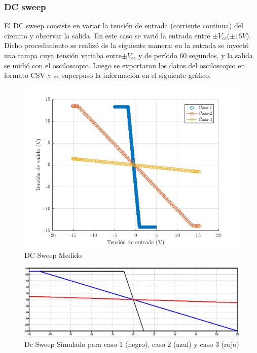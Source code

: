 \documentclass[../../main.tex]{subfiles}
\begin{document}
\subsubsection{DC sweep}
El DC sweep consiste en variar la tensión de entrada (corriente continua) del circuito y observar la salida. En este caso se varió la entrada entre $\pm V_{cc}$($\pm 15 V$). Dicho procedimiento se realizó de la siguiente manera: en la entrada se inyect\'o una rampa  cuya  tensión variaba entre$\pm V_{cc}$ y de per\'iodo 60 segundos, y la salida se midió con el osciloscopio. Luego se exportaron los datos del osciloscopio en formato CSV y se superpuso la informaci\'on en el siguiente gr\'afico.

\begin{figure}[H]
\centering
\includegraphics[width=1\textwidth]{imagenes/dc_sweep_inv.png}
\caption{DC Sweep Medido} \label{fig=dcInv}
\end{figure}

\begin{figure}[H]
\centering
\includegraphics[width=1.1\textwidth]{imagenes/dc_sweep_inv_sim.png}
\caption{Dc Sweep Simulado para caso 1 (negro), caso 2 (azul) y caso 3 (rojo)} \label{fig=dcInvSim}
\end{figure}
\end{document}
